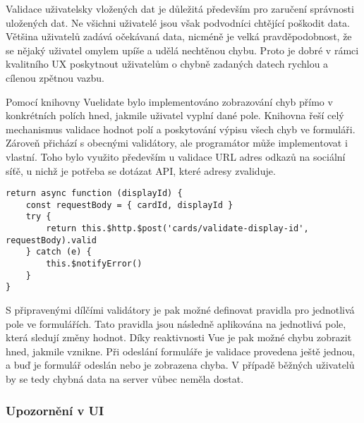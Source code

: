 		Validace uživatelsky vložených dat je důležitá především pro zaručení správnosti uložených dat.
		Ne všichni uživatelé jsou však podvodníci chtějící poškodit data.
		Většina uživatelů zadává očekávaná data, nicméně je velká pravděpodobnost, že se nějaký uživatel omylem upíše
		a udělá nechtěnou chybu.
		Proto je dobré v rámci kvalitního \ac{UX} poskytnout uživatelům o chybně zadaných datech rychlou a cílenou zpětnou vazbu.


		Pomocí knihovny Vuelidate bylo implementováno zobrazování chyb přímo v konkrétních polích hned,
		jakmile uživatel vyplní dané pole.
		Knihovna řeší celý mechanismus validace hodnot polí a poskytování výpisu všech chyb ve formuláři.
		Zároveň přichází s obecnými validátory, ale programátor může implementovat i vlastní.
		Toho bylo využito především u validace \ac{URL} adres odkazů na sociální síťě, u nichž je potřeba se dotázat \ac{API},
		které adresy zvaliduje.

		\begin{lstlisting}[caption={Vlastního validátor využívající API k validaci hodnoty. Zdroj: [autor]}]
return async function (displayId) {
	const requestBody = { cardId, displayId }
	try {
		return this.$http.$post('cards/validate-display-id', requestBody).valid
	} catch (e) {
		this.$notifyError()
	}
}
		\end{lstlisting}

%

		S připravenými dílčími validátory je pak možné definovat pravidla pro jednotlivá pole ve formulářích.
		Tato pravidla jsou následně aplikována na jednotlivá pole, která sledují změny hodnot.
		Díky reaktivnosti Vue je pak možné chybu zobrazit hned, jakmile vznikne.
		Při odeslání formuláře je validace provedena ještě jednou, a buď je formulář odeslán nebo je
		zobrazena chyba.
		V případě běžných uživatelů by se tedy chybná data na server vůbec neměla dostat.

		\subsubsection{Upozornění v UI}

